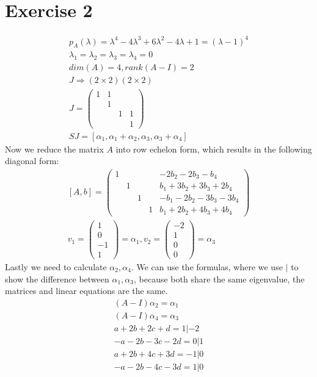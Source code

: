 \section{Exercise 2}
\begin{gather*}
p_A(\lambda) = \lambda^4 - 4\lambda^3 + 6 \lambda^2 - 4 \lambda +1 = (\lambda-1)^4\\
\lambda_1 = \lambda_2 = \lambda_3 = \lambda_4 =0 \\ 
dim(A) = 4, rank(A-I) = 2 \\
J \Rightarrow (2 \times 2) ( 2 \times 2)\\
J = \left( \begin{array}{cccc}
1 & 1 & & \\
& 1 &&\\
& & 1 & 1 \\
& & &1
\end{array} \right)\\
SJ = \left[ \alpha_1 , \alpha_1+\alpha_2 ,\alpha_3,\alpha_3 + \alpha_4 \right]
\end{gather*}
Now we reduce the matrix $A$ into row echelon form, which results in the following diagonal form:
\begin{gather*}
\left[ A,b\right] = \left( \begin{array}{ccccc}
1 & & & & -2b_2 -2b_3 -b_4 \\
 & 1 & & & b_1 + 3b_2 + 3b_3 + 2b_4 \\
 & & 1 & & -b_1 -2b_2 - 3b_3 - 3b_4\\
 & & & 1 & b_1 + 2b_2 +4b_3 +4b_4
\end{array} \right)\\
v_1 = \left( \begin{array}{c}
1\\
0\\
-1\\
1
\end{array} \right) = \alpha_1,
v_2 = \left( \begin{array}{c}
-2\\
1\\
0\\
0
\end{array} \right) = \alpha_3
\end{gather*}
Lastly we need to calculate $\alpha_2,\alpha_4$.
We can use the formulas, where we use $|$  to show the difference between $\alpha_1,\alpha_3$, because both share the same eigenvalue, the matrices and linear equations are the same. 
\begin{gather*}
(A-I)\alpha_2 = \alpha_1 \\
(A-I)\alpha_4 = \alpha_3 \\
a+2b +2c +d = 1 | -2\\
-a -2b -3c -2d =0 | 1 \\
a + 2b +4c +3d = -1 | 0\\
-a -2b -4c -3d = 1 | 0
\end{gather*}
